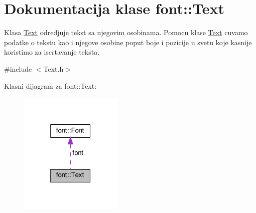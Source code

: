 \hypertarget{classfont_1_1Text}{}\section{Dokumentacija klase font\+:\+:Text}
\label{classfont_1_1Text}


Klasa \hyperlink{classfont_1_1Text}{Text} odredjuje tekst sa njegovim osobinama. Pomocu klase \hyperlink{classfont_1_1Text}{Text} cuvamo podatke o tekstu kao i njegove osobine poput boje i pozicije u svetu koje kasnije koristimo za iscrtavanje teksta.  




{\ttfamily \#include $<$Text.\+h$>$}



Klasni dijagram za font\+:\+:Text\+:
\nopagebreak
\begin{figure}[H]
\begin{center}
\leavevmode
\includegraphics[width=139pt]{classfont_1_1Text__coll__graph}
\end{center}
\end{figure}
